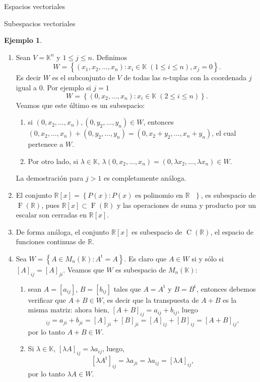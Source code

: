 \documentclass[a4paper,12pt,twoside,spanish,reqno]{amsbook}
\theoremstyle{definition}
\newtheorem{ejemplo}{Ejemplo}[section]
\theoremstyle{remark}
\renewcommand{\t}{{\operatorname{t}}}
\newcommand{\R}{\mathbb R}
\newcommand{\K}{\mathbb K}
\begin{document}
\begin{chapter}{Espacios vectoriales}
\begin{section}{Subespacios vectoriales}
\begin{ejemplo}
\begin{enumerate}
        
        \item Sean $V=\K^n$ y $1\le j \le n$. Definimos 
        $$
        W = \left\{ (x_1,x_2,\ldots,x_n): x_i \in \K\; (1 \le i \le n), x_j =0\right\}.
        $$
        Es decir $W$  es el subconjunto de $V$ de todas las $n$-tuplas con la coordenada $j$ igual a 0. Por ejemplo  si $j=1$ 
        $$
        W = \left\{ (0,x_2,\ldots,x_n): x_i \in \K \;(2 \le i \le n)\right\}.
        $$
        Veamos que este último es un subespacio: 
        \begin{enumerate}
            \item si $(0,x_2,\ldots,x_n), (0,y_2,\ldots,y_n) \in W$,  entonces
            $(0,x_2,\ldots,x_n)+ (0,y_2,\ldots,y_n) = (0,x_2+y_2,\ldots,x_n+y_n)$, el cual pertenece a $W$. 
            \item 	Por otro lado, si $\lambda \in \K$, $\lambda(0,x_2,\ldots,x_n) = (0,\lambda x_2,\ldots,\lambda x_n) \in W$.
        \end{enumerate}
        La demostración para $j >1$ es completamente análoga. 
        \item El  conjunto $\R[x] = \left\{P(x): P(x) \text{ es polinomio en $\R$ } \right\}$, es subespacio de $\operatorname{F}(\R)$, pues $\R[x] \subset \operatorname{F}(\R)$ y las operaciones de suma y producto por un escalar son cerradas en $\R[x]$.
        \item De forma análoga, el conjunto $\R[x]$ es subespacio de $\operatorname{C}(\R)$,  el espacio de funciones continuas de  $\R$.
        \item Sea $W= \left\{A \in M_n(\K): A^\t = A \right\}$. Es claro que  $A \in W$ si y sólo si $[A]_{ij} = [A]_{ji}$. Veamos que  $W$ es subespacio de $M_n(\K)$: 
        \begin{enumerate}
            \item sean $A=[a_{ij}]$, $B= [b_{ij}]$ tales que $A=A^\t$ y $B=B^\t$, entonces debemos verificar que $A+ B \in W$,  es decir que la transpuesta de $A+B$  es la misma matriz: ahora bien, $[A+B]_{ij} = a_{ij}+b_{ij}$, luego 
            \begin{equation*}
                [(A+B)^\t]_{ij} =a_{ji}+b_{ji} = [A]_{ji} + [B]_{ji} = [A]_{ij} + [B]_{ij} = [A+B]_{ij},
            \end{equation*}
            por lo tanto $A+B \in W$.
            \item Si $\lambda \in \K$, $[\lambda A]_{ij} = \lambda a_{ij}$, luego, 
            $$
            [\lambda A^\t]_{ij} = \lambda a_{ji} = \lambda a_{ij} = [\lambda A]_{ij},
            $$
            por lo tanto $\lambda A \in W$.
        \end{enumerate} 	


\end{enumerate}
\end{ejemplo}
\end{section}
\end{chapter}
\end{document}
